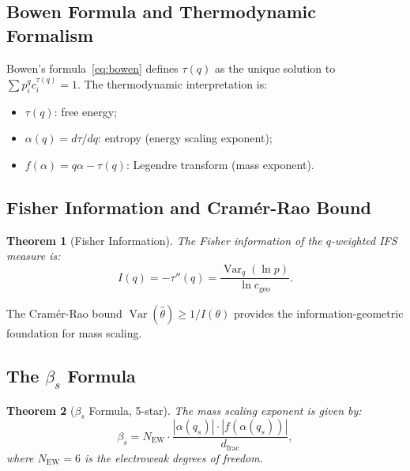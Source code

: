 \documentclass[12pt,a4paper]{article}
\newtheorem{theorem}{Theorem}[section]
\begin{document}
\subsection{Bowen Formula and Thermodynamic Formalism}

Bowen's formula~\eqref{eq:bowen} defines $\tau(q)$ as the unique solution to 
$\sum p_i^q c_i^{\tau(q)} = 1$. The thermodynamic interpretation is:
\begin{itemize}
  \item $\tau(q)$: free energy;
  \item $\alpha(q) = d\tau/dq$: entropy (energy scaling exponent);
  \item $f(\alpha) = q\alpha - \tau(q)$: Legendre transform (mass exponent).
\end{itemize}

\subsection{Fisher Information and Cram\'er-Rao Bound}

\begin{theorem}[Fisher Information]
The Fisher information of the $q$-weighted IFS measure is:
\begin{equation}
I(q) = -\tau''(q) = \frac{\operatorname{Var}_q(\ln p)}{\ln c_{\text{geo}}}.
\end{equation}
\end{theorem}

The Cram\'er-Rao bound $\operatorname{Var}(\hat{\theta}) \ge 1/I(\theta)$ 
provides the information-geometric foundation for mass scaling.

\subsection{The $\beta_s$ Formula}

\begin{theorem}[$\beta_s$ Formula, 5-star]
\label{thm:beta}
The mass scaling exponent is given by:
\begin{equation}
\beta_s = N_{\text{EW}} \cdot \frac{|\alpha(q_s)| \cdot |f(\alpha(q_s))|}{d_{\text{frac}}},
\end{equation}
where $N_{\text{EW}} = 6$ is the electroweak degrees of freedom.
\end{theorem}
\end{document}
